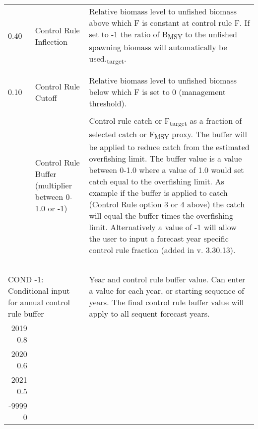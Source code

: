 \begin{landscape}
{\begin{longtable}{p{3.2cm} p{7cm} p{10.8cm}}
  0.40 \Tstrut & Control Rule Inflection & \multirow{1}{1cm}[-0.2cm]{\parbox{11cm}{Relative biomass level to unfished biomass above which F is constant at control rule F. If set to -1 the ratio of B\textsubscript{MSY} to the unfished spawning biomass will automatically be used.\textsubscript{target}.}} \Bstrut\\
    & & \\
    & & \\

  \hline
  0.10 \Tstrut & Control Rule Cutoff & \multirow{1}{1cm}[-0.2cm]{\parbox{11cm}{Relative biomass level to unfished biomass below which F is set to 0 (management threshold).}} \\
    & & \Bstrut\\

  \pagebreak
  0.75 \Tstrut & Control Rule Buffer (multiplier between 0-1.0 or -1) & \multirow{1}{1cm}[-0.25cm]{\parbox{11cm}{Control rule catch or F\textsubscript{target} as a fraction of selected catch or F\textsubscript{MSY} proxy. The buffer will be applied to reduce catch from the estimated overfishing limit. The buffer value is a value between 0-1.0 where a value of 1.0 would set catch equal to the overfishing limit. As example if the buffer is applied to catch (Control Rule option 3 or 4 above) the catch will equal the buffer times the overfishing limit. Alternatively a value of -1 will allow the user to input a forecast year specific control rule fraction (added in v. 3.30.13).}} \\ 
    & & \\
    & & \\
    & & \\
    & & \\
    & & \Bstrut\\

  \multicolumn{2}{l}{COND -1: Conditional input for annual control rule buffer} & \multirow{1}{1cm}[-0.25cm]{\parbox{11cm}{Year and control rule buffer value. Can enter a value for each year, or starting sequence of years. The final control rule buffer value will apply to all sequent forecast years.}} \Tstrut\\
  \multicolumn{1}{r}{2019 0.8} & & \\
  \multicolumn{1}{r}{2020 0.6} & & \\ 
  \multicolumn{1}{r}{2021 0.5} & & \\ 
  \multicolumn{1}{r}{-9999 0} & & \Bstrut\\ 


\end{longtable}}
\end{landscape}
